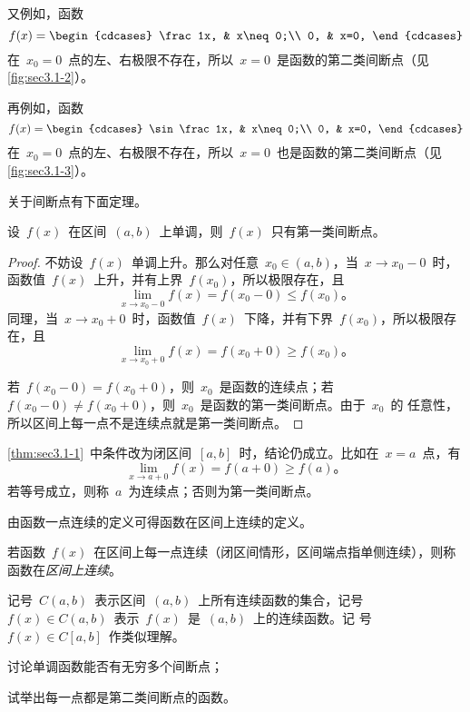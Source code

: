又例如，函数
\[
  f(x)=\begin{cdcases}
    \frac1x, & x\neq0;\\
    0, & x=0,
  \end{cdcases}
\]
在~$x_0=0$~点的左、右极限不存在，所以~$x=0$~是函数的第二类间断点（见\ref{fig:sec3.1-2}）。

再例如，函数
\[
  f(x)=\begin{cdcases}
    \sin\frac1x, & x\neq0;\\
    0, & x=0,
  \end{cdcases}
\]
在~$x_0=0$~点的左、右极限不存在，所以~$x=0$~也是函数的第二类间断点（见\ref{fig:sec3.1-3}）。

关于间断点有下面定理。

\begin{theorem}\label{thm:sec3.1-1}
设~$f(x)$~在区间~$(a,b)$~上单调，则~$f(x)$~只有第一类间断点。
\end{theorem}
\begin{proof}
不妨设~$f(x)$~单调上升。那么对任意~$x_0\in(a,b)$，当~$x\to x_0-0$~时，函数值~$f(x)$~上升，并有上界~$f(x_0)$，所以极限存在，且
\[
  \lim_{x\to x_0-0}f(x)=f(x_0-0)\leq f(x_0) 。
\]
同理，当~$x\to x_0+0$~时，函数值~$f(x)$~下降，并有下界~$f(x_0)$，所以极限存在，且
\[
  \lim_{x\to x_0+0}f(x)=f(x_0+0)\geq f(x_0) 。
\]

若~$f(x_0-0)=f(x_0+0)$，则~$x_0$~是函数的连续点；若~$f(x_0-0)\neq f(x_0+0)$，则~$x_0$~是函数的第一类间断点。由于~$x_0$~的
任意性，所以区间上每一点不是连续点就是第一类间断点。
\end{proof}

\begin{remark}
\ref{thm:sec3.1-1}~中条件改为闭区间~$[a,b]$~时，结论仍成立。比如在~$x=a$~点，有
\[
  \lim_{x\to a+0}f(x)=f(a+0)\geq f(a)。
\]
若等号成立，则称~$a$~为连续点；否则为第一类间断点。
\end{remark}

由函数一点连续的定义可得函数在区间上连续的定义。

\begin{definition}
若函数~$f(x)$~在区间上每一点连续（闭区间情形，区间端点指单侧连续），则称函数在\emph{区间上连续}。
\end{definition}

记号~$C(a,b)$~表示区间~$(a,b)$~上所有连续函数的集合，记号~$f(x)\in C(a,b)$~表示~$f(x)$~是~$(a,b)$~上的连续函数。记
号~$f(x)\in C[a,b]$~作类似理解。

\begin{quiz}
\begin{thmenumlist}
\item 讨论单调函数能否有无穷多个间断点；
\item 试举出每一点都是第二类间断点的函数。
\end{thmenumlist}
\end{quiz}

